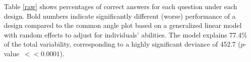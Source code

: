 \documentclass[journal]{vgtc}\usepackage{graphicx, color}
\begin{document}

Table \ref{raw} shows percentages of correct answers for each question under each design. Bold numbers indicate significantly different (worse) performance of a design compared to the common angle plot based on a generalized linear model with random effects to adjust for individuals' abilities. The model explains 77.4\% of the total variability, corresponding to a highly significant deviance of 452.7 ($p$-value~$<\!\!\!< 0.0001$).

%
%
\end{document}
